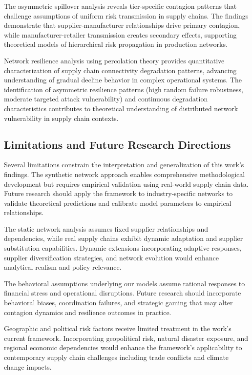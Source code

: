 \documentclass[a4 paper, 11pt,twoside]{article}
\newcommand{\0}{\Bf{0}}
\theoremstyle{definition}
\begin{document}
The asymmetric spillover analysis reveals tier-specific contagion patterns that challenge assumptions of uniform risk transmission in supply chains. The findings demonstrate that supplier-manufacturer relationships drive primary contagion, while manufacturer-retailer transmission creates secondary effects, supporting theoretical models of hierarchical risk propagation in production networks.

Network resilience analysis using percolation theory provides quantitative characterization of supply chain connectivity degradation patterns, advancing understanding of gradual decline behavior in complex operational systems. The identification of asymmetric resilience patterns (high random failure robustness, moderate targeted attack vulnerability) and continuous degradation characteristics contributes to theoretical understanding of distributed network vulnerability in supply chain contexts.

\subsection{Limitations and Future Research Directions}

Several limitations constrain the interpretation and generalization of this work's findings. The synthetic network approach enables comprehensive methodological development but requires empirical validation using real-world supply chain data. Future research should apply the framework to industry-specific networks to validate theoretical predictions and calibrate model parameters to empirical relationships.

The static network analysis assumes fixed supplier relationships and dependencies, while real supply chains exhibit dynamic adaptation and supplier substitution capabilities. Dynamic extensions incorporating adaptive responses, supplier diversification strategies, and network evolution would enhance analytical realism and policy relevance.

The behavioral assumptions underlying our models assume rational responses to financial stress and operational disruptions. Future research should incorporate behavioral biases, coordination failures, and strategic gaming that may alter contagion dynamics and resilience outcomes in practice.

Geographic and political risk factors receive limited treatment in the work's current framework. Incorporating geopolitical risk, natural disaster exposure, and regional economic dependencies would enhance the framework's applicability to contemporary supply chain challenges including trade conflicts and climate change impacts.
\end{document}
